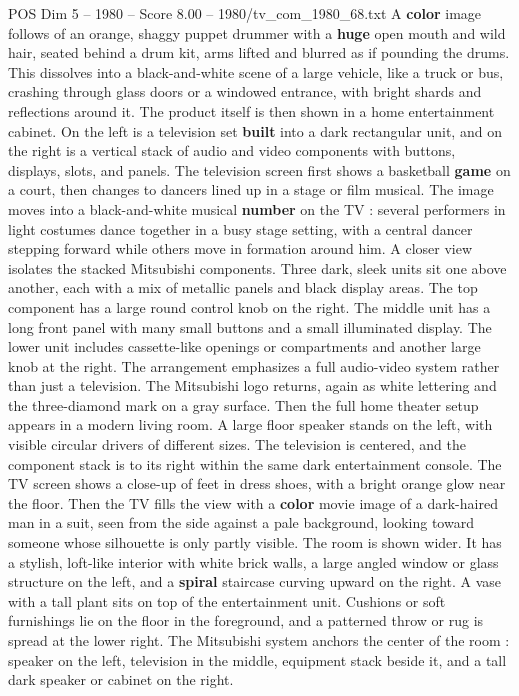 \begin{textsample}{POS Dim 5 – 1980 – Score 8.00 – 1980/tv\_com\_1980\_68.txt}
A \textbf{color} image follows of an orange, shaggy puppet drummer with a \textbf{huge} open mouth and wild hair, seated behind a drum kit, arms lifted and blurred as if pounding the drums.
This dissolves into a black-and-white scene of a large vehicle, like a truck or bus, crashing through glass doors or a windowed entrance, with bright shards and reflections around it.
The product itself is then shown in a home entertainment cabinet.
On the left is a television set \textbf{built} into a dark rectangular unit, and on the right is a vertical stack of audio and video components with buttons, displays, slots, and panels.
The television screen first shows a basketball \textbf{game} on a court, then changes to dancers lined up in a stage or film musical.
The image moves into a black-and-white musical \textbf{number} on the TV : several performers in light costumes dance together in a busy stage setting, with a central dancer stepping forward while others move in formation around him.
A closer view isolates the stacked Mitsubishi components.
Three dark, sleek units sit one above another, each with a mix of metallic panels and black display areas.
The top component has a large round control knob on the right.
The middle unit has a long front panel with many small buttons and a small illuminated display.
The lower unit includes cassette-like openings or compartments and another large knob at the right.
The arrangement emphasizes a full audio-video system rather than just a television.
The Mitsubishi logo returns, again as white lettering and the three-diamond mark on a gray surface.
Then the full home theater setup appears in a modern living room.
A large floor speaker stands on the left, with visible circular drivers of different sizes.
The television is centered, and the component stack is to its right within the same dark entertainment console.
The TV screen shows a close-up of feet in dress shoes, with a bright orange glow near the floor.
Then the TV fills the view with a \textbf{color} movie image of a dark-haired man in a suit, seen from the side against a pale background, looking toward someone whose silhouette is only partly visible.
The room is shown wider.
It has a stylish, loft-like interior with white brick walls, a large angled window or glass structure on the left, and a \textbf{spiral} staircase curving upward on the right.
A vase with a tall plant sits on top of the entertainment unit.
Cushions or soft furnishings lie on the floor in the foreground, and a patterned throw or rug is spread at the lower right.
The Mitsubishi system anchors the center of the room : speaker on the left, television in the middle, equipment stack beside it, and a tall dark speaker or cabinet on the right.

\end{textsample}
